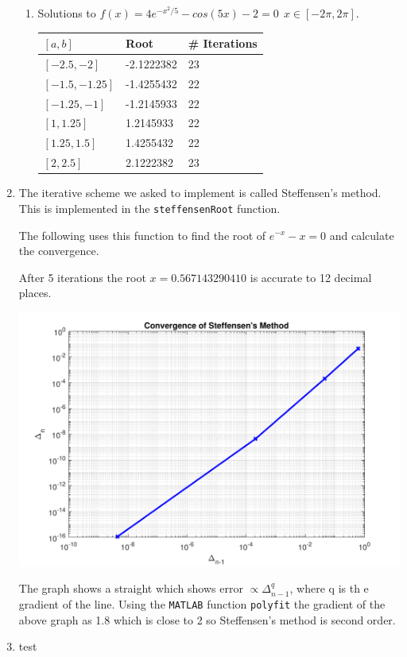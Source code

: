 \documentclass[a4paper,11pt]{article}
\begin{document}
\begin{enumerate}
\begin{enumerate}
		
		\item Solutions to $f(x) = 4e^{-x^{2}/5} - cos(5x) - 2 = 0 \  \ 
		x\in[-2\pi,2\pi]$.
		
		\begin{table}[!h]
			\centering
			\begin{tabular}{l|ll}
				$[a,b]$        & Root       & \# Iterations \\ \hline
				$[-2.5,-2]$    & -2.1222382 & 23            \\
				$[-1.5,-1.25]$ & -1.4255432 & 22            \\
				$[-1.25,-1]$   & -1.2145933 & 22            \\
				$[1,1.25]$     & 1.2145933  & 22            \\
				$[1.25,1.5]$   & 1.4255432  & 22            \\
				$[2,2.5]$      & 2.1222382  & 23           
			\end{tabular}
		\end{table}
	\end{enumerate}


	\item The iterative scheme we asked to implement is called Steffensen's 
	method. This is implemented in the \verb*|steffensenRoot| function.
	
	The following uses this function to find the root of $e^{-x} - x = 0$ and 
	calculate the convergence.
	
	After 5 iterations the root $x = 0.567143290410$ is accurate to 12 
	decimal places.
	\begin{center}
		\includegraphics[scale=0.6]{images/Q1c.pdf}
	\end{center}
	The graph shows a straight which shows error $\propto \Delta_{n-1}^{q}$, 
	where q is th e gradient of the line. Using the \verb*|MATLAB| function 
	\verb*|polyfit| the gradient of the 
	above graph as 1.8 which is close to 2 so Steffensen's method is second 
	order.
	
	\item test
\end{enumerate}
\end{document}
